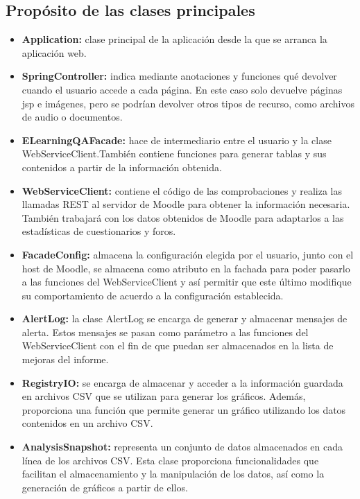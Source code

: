 \subsection{Propósito de las clases principales}
\begin{itemize}
	\item \textbf{Application:} clase principal de la aplicación desde la que se arranca la aplicación web.
	\item \textbf{SpringController:} indica mediante anotaciones y funciones qué devolver cuando el usuario accede a cada página. En este caso solo devuelve páginas jsp e imágenes, pero se podrían devolver otros tipos de recurso, como archivos de audio o documentos.
	\item \textbf{ELearningQAFacade:} hace de intermediario entre el usuario y la clase WebServiceClient.También contiene funciones para generar tablas y sus contenidos a partir de la información obtenida. 
	\item \textbf{WebServiceClient:} contiene el código de las comprobaciones y realiza las llamadas REST al servidor de Moodle para obtener la información necesaria. También trabajará con los datos obtenidos de Moodle para adaptarlos a las estadísticas de cuestionarios y foros.
	\item \textbf{FacadeConfig:} almacena la configuración elegida por el usuario, junto con el host de Moodle, se almacena como atributo en la fachada para poder pasarlo a las funciones del WebServiceClient y así permitir que este último modifique su comportamiento de acuerdo a la configuración establecida.
	\item \textbf{AlertLog:} la clase AlertLog se encarga de generar y almacenar mensajes de alerta. Estos mensajes se pasan como parámetro a las funciones del WebServiceClient con el fin de que puedan ser almacenados en la lista de mejoras del informe.
	\item \textbf{RegistryIO:} se encarga de almacenar y acceder a la información guardada en archivos CSV que se utilizan para generar los gráficos. Además, proporciona una función que permite generar un gráfico utilizando los datos contenidos en un archivo CSV.
	\item \textbf{AnalysisSnapshot:} representa un conjunto de datos almacenados en cada línea de los archivos CSV. Esta clase proporciona funcionalidades que facilitan el almacenamiento y la manipulación de los datos, así como la generación de gráficos a partir de ellos.
\end{itemize}
